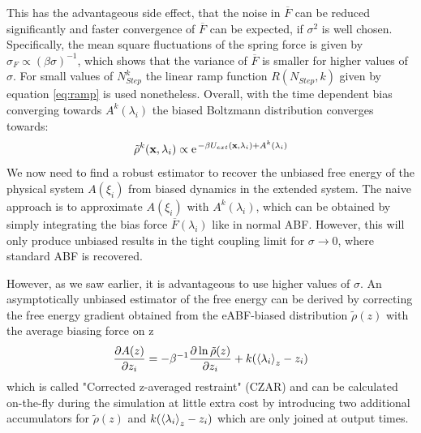This has the advantageous side effect, that the noise in $\overline{F}$ can be reduced significantly and faster convergence of $\overline{F}$ can be expected, if $\sigma^2$ is well chosen.\autocite{lesage2017smoothed} Specifically, the mean square fluctuations of the spring force is given by $\sigma_F \propto (\beta\sigma)^{-1}$, which shows that the variance of $\overline{F}$ is smaller for higher values of $\sigma$.
For small values of $N_{Step}^{k}$ the linear ramp function $R(N_{Step},k)$ given by equation \ref{eq:ramp} is used nonetheless. Overall, with the time dependent bias converging towards $A^{k}(\lambda_{i})$ the biased Boltzmann distribution converges towards:
\begin{equation}
  \tilde{\rho}^k(\textbf{x},\lambda_i) \propto \e^{-\beta U_{ext}(\textbf{x},\lambda_i) + A^{k}(\lambda_i)}
\end{equation}
We now need to find a robust estimator to recover the unbiased free energy of the physical system $A(\xi_i)$ from biased dynamics in the extended system.
The naive approach is to approximate $A(\xi_i)$ with $A^k(\lambda_i)$, which can be obtained by simply integrating the bias force $\overline{F}(\lambda_{i})$ like in normal ABF.
However, this will only produce unbiased results in the tight coupling limit for $\sigma \rightarrow 0$, where standard ABF is recovered.

However, as we saw earlier, it is advantageous to use higher values of $\sigma$.
An asymptotically unbiased estimator of the free energy can be derived by correcting the free energy gradient obtained from the eABF-biased distribution $\tilde{\rho}(z)$ with the average biasing force on z
\begin{equation}
  \frac{\partial A(z)}{\partial z_i} = -\beta^{-1}\frac{\partial \ln \tilde{\rho}(z)}{\partial z_i} + k(\braket{\lambda_i}_{z}-z_{i}) \label{eq:CZAR}
\end{equation}
which is called "Corrected z-averaged restraint" (CZAR) and can be calculated on-the-fly during the simulation at little extra cost by introducing two additional accumulators for $\tilde{\rho}(z)$ and $k(\braket{\lambda_i}_{z}-z_{i})$ which are only joined at output times.\autocite{lesage2017smoothed}

